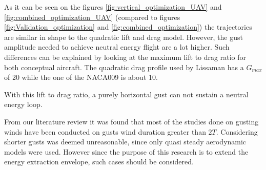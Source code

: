 As it can be seen on the figures \ref{fig:vertical_optimization_UAV} and \ref{fig:combined_optimization_UAV} (compared to figures \ref{fig:Validation_optimization} and \ref{fig:combined_optimization}) the trajectories are similar in shape to the quadratic lift and drag model.
However, the gust amplitude needed to achieve neutral energy flight are a lot higher.
Such differences can be explained by looking at the maximum lift to drag ratio for both conceptual aircraft.
The quadratic drag profile used by Lissaman has a $G_{max}$ of 20 while the one of the NACA009 is about 10.

\FloatBarrier

\par With this lift to drag ratio, a purely horizontal gust can not sustain a neutral energy loop.

\FloatBarrier

%



From our literature review it was found that most of the studies done on gusting winds have been conducted on gusts wind duration greater than $2T$.
Considering shorter gusts was deemed unreasonable, since only quasi steady aerodynamic models were used. 
However since the purpose of this research is to extend the energy extraction envelope, such cases should be considered.

